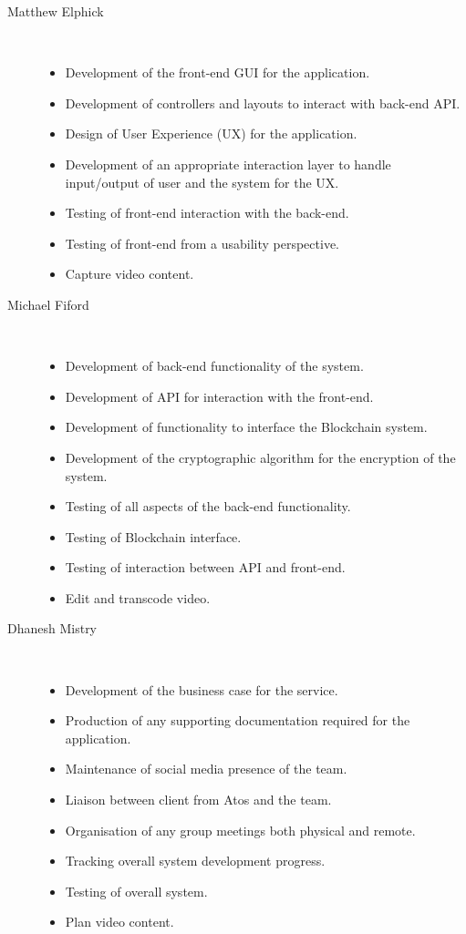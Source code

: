 \documentclass{article}
\begin{document}
\begin{description}
    \item[Matthew Elphick]
        \
        \begin{itemize}
            \item Development of the front-end GUI for the application.
            \item Development of controllers and layouts to interact with back-end API.
            \item Design of User Experience (UX) for the application.
            \item Development of an appropriate interaction layer to handle input/output of user and the system for the UX.
            \item Testing of front-end interaction with the back-end.
            \item Testing of front-end from a usability perspective. 
            \item Capture video content.
        \end{itemize}
    \item[Michael Fiford]
        \
        \begin{itemize}
            \item Development of back-end functionality of the system.
            \item Development of API for interaction with the front-end.
            \item Development of functionality to interface the Blockchain system.
            \item Development of the cryptographic algorithm for the encryption of the system.
            \item Testing of all aspects of the back-end functionality.
            \item Testing of Blockchain interface.
            \item Testing of interaction between API and front-end.
            \item Edit and transcode video.
        \end{itemize}
    \item[Dhanesh Mistry]
         \
        \begin{itemize}
            \item Development of the business case for the service.
            \item Production of any supporting documentation required for the application.
            \item Maintenance of social media presence of the team.
            \item Liaison between client from Atos and the team.
            \item Organisation of any group meetings both physical and remote.
            \item Tracking overall system development progress.
            \item Testing of overall system.
            \item Plan video content.
        \end{itemize}
\end{description}
\end{document}

